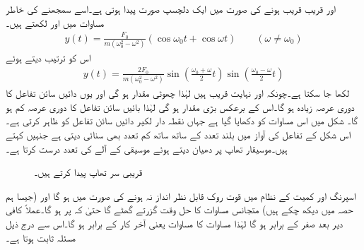  اور  قریب قریب ہونے کی صورت میں ایک دلچسپ صورت پیدا ہوتی ہے۔اسے سمجھنے کی خاطر مساوات  میں  اور  لکھتے ہیں۔
\begin{align}\label{مساوات_سادہ_دو_تھاپ_الف}
y(t)=\frac{F_0}{m(\omega_0^2-\omega^2)}(\cos \omega_0 t+\cos \omega t)\quad \quad (\omega \ne \omega_0)
\end{align}
اس کو ترتیب دیتے ہوئے
\begin{align}\label{مساوات_سادہ_دو_تھاپ_ب}
y(t)=\frac{2F_0}{m(\omega_0^2-\omega^2)}\sin\left( \frac{\omega_0+\omega}{2}t\right)\sin\left( \frac{\omega_0-\omega}{2}t\right)
\end{align}
لکھا جا سکتا ہے۔چونکہ  اور  نہایت قریب ہیں لہٰذا  چھوٹی مقدار ہو گی اور یوں دائیں سائن تفاعل کا دوری عرصہ زیادہ ہو گا۔اس کے برعکس  بڑی مقدار ہو گی لہٰذا بائیں سائن تفاعل کا دوری عرصہ کم ہو گا۔ شکل  میں اس مساوات کو دکھایا گیا ہے جہاں نقطہ دار لکیر دائیں سائن تفاعل کو ظاہر کرتی ہے۔اس شکل کے تفاعل کی آواز میں بلند تعدد کے ساتھ ساتھ کم تعدد بھی سنائی دیتی ہے جنہیں  کہتے ہیں۔موسیقار  تھاپ پر دھیان دیتے ہوئے موسیقی کے  آلے  کی تعدد درست کرتا ہے۔
\begin{figure}
\centering
{}
\caption{قریبی سر تھاپ پیدا کرتے ہیں۔}
\label{شکل_سادہ_دو_گمک_تھاپ}
\end{figure}

اسپرنگ اور کمیت کے نظام میں قوت روک قابل نظر انداز نہ ہونے کی صورت میں  ہو گا اور (جیسا ہم حصہ  میں دیکھ چکے ہیں) متجانس مساوات  کا حل  وقت گزرتے  گھٹے گا حتیٰ کہ  پر  ہو گا۔عملاً کافی دیر بعد  صفر کے برابر ہو گا لہٰذا مساوات  کا   مساوات  یعنی  آخر کار    کے برابر ہو گا۔اس سے درج ذیل مسئلہ ثابت ہوتا ہے۔

